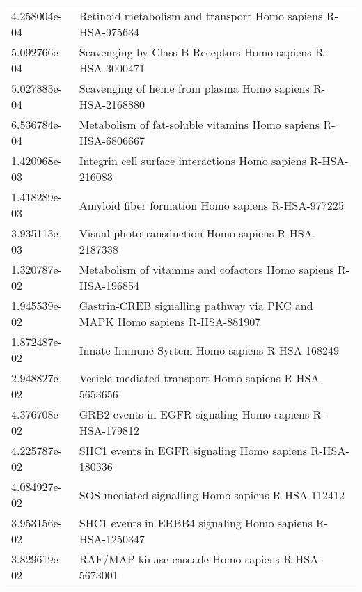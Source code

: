 \begin{longtable}{p{2.4cm}p{14.5cm}}
             4.258004e-04 &                                   Retinoid metabolism and transport Homo sapiens R-HSA-975634 \\
             5.092766e-04 &                                    Scavenging by Class B Receptors Homo sapiens R-HSA-3000471 \\
             5.027883e-04 &                                     Scavenging of heme from plasma Homo sapiens R-HSA-2168880 \\
             6.536784e-04 &                                 Metabolism of fat-soluble vitamins Homo sapiens R-HSA-6806667 \\
             1.420968e-03 &                                  Integrin cell surface interactions Homo sapiens R-HSA-216083 \\
             1.418289e-03 &                                             Amyloid fiber formation Homo sapiens R-HSA-977225 \\
             3.935113e-03 &                                           Visual phototransduction Homo sapiens R-HSA-2187338 \\
             1.320787e-02 &                                Metabolism of vitamins and cofactors Homo sapiens R-HSA-196854 \\
             1.945539e-02 &                    Gastrin-CREB signalling pathway via PKC and MAPK Homo sapiens R-HSA-881907 \\
             1.872487e-02 &                                                Innate Immune System Homo sapiens R-HSA-168249 \\
             2.948827e-02 &                                         Vesicle-mediated transport Homo sapiens R-HSA-5653656 \\
             4.376708e-02 &                                       GRB2 events in EGFR signaling Homo sapiens R-HSA-179812 \\
             4.225787e-02 &                                       SHC1 events in EGFR signaling Homo sapiens R-HSA-180336 \\
             4.084927e-02 &                                             SOS-mediated signalling Homo sapiens R-HSA-112412 \\
             3.953156e-02 &                                     SHC1 events in ERBB4 signaling Homo sapiens R-HSA-1250347 \\
             3.829619e-02 &                                             RAF/MAP kinase cascade Homo sapiens R-HSA-5673001 \\

\end{longtable}
